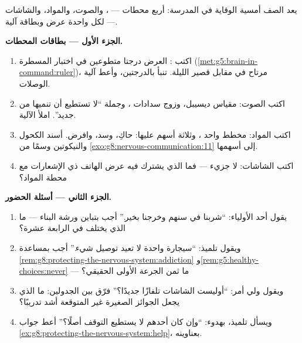 \begin{problem}\label{pb:g8:protecting-the-nervous-system:1}
يعد الصف أمسية الوقاية في المدرسة: أربع محطات ---
، والصوت، والمواد، والشاشات --- لكل واحدة عرض
وبطاقة آلية.

\medskip\noindent\textbf{الجزء الأول --- بطاقات
المحطات.}
\begin{enumerate}
  \item اكتب  : العرض درجتا متطوعين في اختبار
        المسطرة (\cref{met:g5:brain-in-command:ruler})،
        مرتاح في مقابل قصير الليلة. تنبأ بالدرجتين، وأعط
        آلية الوصلات.
  \item اكتب  الصوت: مقياس ديسيبل، وزوج سدادات
        ، وجملة ``لا تستطيع أن تنميها من جديد''. املأ
        الآلية.
  \item اكتب  المواد: مخطط واحد ، وثلاثة أسهم
        عليها: حاكِ، وسد، وافرض. أسند الكحول والنيكوتين
        وسمًا من \cref{exo:g8:nervous-communication:11}
        إلى أسهمها.
  \item اكتب  الشاشات: لا جزيء --- فما الذي يشترك
        فيه عرض الهاتف ذي الإشعارات مع محطة المواد؟
\end{enumerate}

\medskip\noindent\textbf{الجزء الثاني --- أسئلة
الحضور.}
\begin{enumerate}[resume]
  \item يقول أحد الأولياء: ``شربنا في سنهم وخرجنا
        بخير.'' أجب بتباين ورشة البناء --- ما الذي
        يختلف في الرابعة عشرة؟
  \item ويقول تلميذ: ``سيجارة واحدة لا تعيد توصيل
        شيء.'' أجب بمساعدة
        \cref{rem:g8:protecting-the-nervous-system:addiction}
        و\cref{rem:g5:healthy-choices:never} --- ما ثمن
        الجرعة الأولى الحقيقي؟
  \item ويقول ولي أمر: ``أوليست الشاشات تلفازًا
        جديدًا؟'' فرّق بين الجدولين: ما الذي يجعل
        الجوائز الصغيرة غير المتوقعة أشد تدريبًا؟
  \item ويسأل تلميذ، بهدوء: ``وإن كان أحدهم لا يستطيع
        التوقف أصلًا؟'' أعط جواب
        \cref{ex:g8:protecting-the-nervous-system:help}،
        بعناوينه.
\end{enumerate}


\end{problem}
